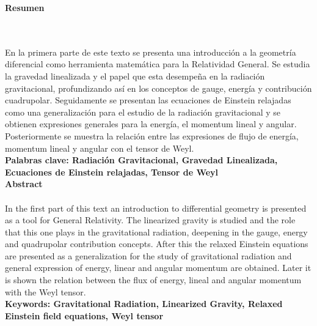 \textbf{\LARGE Resumen}
\\\\
En la primera parte de este texto se presenta una introducci\'on a la geometr\'ia diferencial como herramienta matem\'atica para la Relatividad General. Se estudia la gravedad linealizada y el papel que esta desempe\~na en la radiaci\'on gravitacional, profundizando as\'i en los conceptos de gauge, energía y contribución cuadrupolar. Seguidamente se presentan las ecuaciones de Einstein relajadas como una generalización para el estudio de la radiación gravitacional y se obtienen expresiones generales para la energía, el momentum lineal y angular. Posteriormente se muestra la relación entre las expresiones de flujo de energía, momentum lineal y angular con el tensor de Weyl.\\[2.0cm]
\textbf{\small Palabras clave: Radiación Gravitacional, Gravedad Linealizada, Ecuaciones de Einstein relajadas, Tensor de Weyl}\\[1.0cm]
\textbf{\LARGE Abstract}\\\\
In the first part of this text an introduction to differential geometry is presented as a tool for General Relativity. The linearized gravity is studied and the role that this one plays in the gravitational radiation, deepening in the gauge, energy and quadrupolar contribution concepts. After this the relaxed Einstein equations are presented as a generalization for the study of gravitational radiation and general expression of energy, linear and angular momentum are obtained. Later it is shown the relation between the flux of energy, lineal and angular momentum with the Weyl tensor.\\[2.0cm]
\textbf{\small Keywords: Gravitational Radiation, Linearized Gravity, Relaxed Einstein field equations, Weyl tensor}\\[1.0cm]